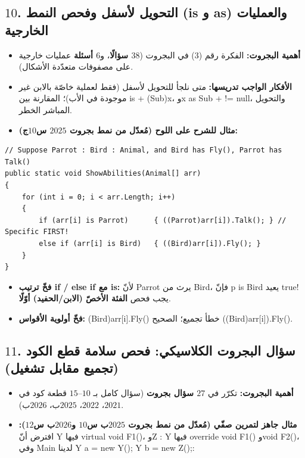 \documentclass[14pt]{extarticle}
\begin{document}
\filbreak
\subsection*{$10$. التحويل لأسفل وفحص النمط (\textenglish{is} و \textenglish{as}) والعمليات الخارجية}
\begin{itemize}[itemsep=0.25em]
    \item \textbf{أهمية البجروت:} الفكرة رقم ($3$) في البجروت (\textbf{$38$ سؤالًا}، و\textbf{$6$ أسئلة} عمليات خارجية على مصفوفات متعدّدة الأشكال).
    \item \textbf{الأفكار الواجب تدريسها:} متى نلجأ للتحويل لأسفل (فقط لعملية خاصّة بالابن غير موجودة في الأب)؛ المقارنة بين \textenglish{is} + \textenglish{(Sub)x}، و\textenglish{x as Sub} + \textenglish{!= null}، والتحويل المباشر الخطر.
    \item \textbf{مثال للشرح على اللوح (مُعدّل من نمط بجروت $2025$ س$10$ج):}
\end{itemize}
\begin{boxCode}
\begin{english}
\begin{verbatim}
// Suppose Parrot : Bird : Animal, and Bird has Fly(), Parrot has Talk()
public static void ShowAbilities(Animal[] arr)
{
    for (int i = 0; i < arr.Length; i++)
    {
        if (arr[i] is Parrot)      { ((Parrot)arr[i]).Talk(); } // Specific FIRST!
        else if (arr[i] is Bird)   { ((Bird)arr[i]).Fly(); }
    }
}
\end{verbatim}
\end{english}
\end{boxCode}
\begin{boxWarning}
\begin{itemize}
    \item \textbf{فخّ ترتيب \textenglish{if / else if} مع \textenglish{is}:} لأنّ \textenglish{Parrot} يرث من \textenglish{Bird}، فإنّ \textenglish{p is Bird} يعيد \textenglish{true}! يجب فحص \textbf{الفئة الأخصّ (الابن/الحفيد) أوّلًا}.
    \item \textbf{فخّ أولوية الأقواس:} \textenglish{(Bird)arr[i].Fly()} خطأ تجميع؛ الصحيح \textenglish{((Bird)arr[i]).Fly()}.
\end{itemize}
\end{boxWarning}

\filbreak
\subsection*{$11$. سؤال البجروت الكلاسيكي: فحص سلامة قطع الكود (تجميع مقابل تشغيل)}
\begin{itemize}[itemsep=0.25em]
    \item \textbf{أهمية البجروت:} تكرّر في \textbf{$27$ سؤال بجروت} (سؤال كامل بـ $10$--$15$ قطعة كود في $2021$، $2022$، $2025$ب، $2026$ب).
    \item \textbf{مثال جاهز لتمرين صفّي (مُعدّل من نمط بجروت $2025$ب س$10$ و$2026$ب س$12$):}
    افترض أنّ \textenglish{Y} فيها \textenglish{virtual void F1()}، و\textenglish{Z : Y} فيها \textenglish{override void F1()} و\textenglish{void F2()}، وفي \textenglish{Main} لدينا \textenglish{Y a = new Y(); Y b = new Z();}:
\end{itemize}
\end{document}
